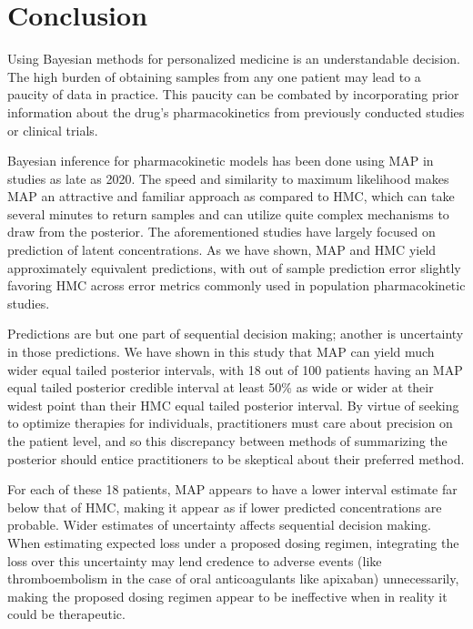 \section{Conclusion}

Using Bayesian methods for personalized medicine is an understandable decision.  The high burden of obtaining samples from any one patient may lead to a paucity of data in practice.  This paucity can be combated by incorporating prior information about the drug’s pharmacokinetics from previously conducted studies or clinical trials.

Bayesian inference for pharmacokinetic models has been done using MAP in studies as late as 2020.  The speed and similarity to maximum likelihood makes MAP an attractive and familiar approach as compared to HMC, which can take several minutes to return samples and can utilize quite complex mechanisms to draw from the posterior. The aforementioned studies have largely focused on prediction of latent concentrations.  As we have shown, MAP and HMC yield approximately equivalent predictions, with out of sample prediction error slightly favoring HMC across error metrics commonly used in population pharmacokinetic studies. 

Predictions are but one part of sequential decision making; another is uncertainty in those predictions.  We have shown in this study that MAP can yield much wider equal tailed posterior intervals, with 18 out of 100 patients having an MAP equal tailed posterior credible interval at least 50\% as wide or wider at their widest point than their HMC equal tailed posterior interval.  By virtue of seeking to optimize therapies for individuals, practitioners must care about precision on the patient level, and so this discrepancy between  methods of summarizing the posterior should entice practitioners to be skeptical about their preferred method.

For each of these 18 patients, MAP appears to have a lower interval estimate far below that of HMC, making it appear as if lower predicted concentrations are probable. Wider estimates of uncertainty affects sequential decision making.  When estimating expected loss under a proposed dosing regimen, integrating the loss over this uncertainty may lend credence to adverse events (like thromboembolism in the case of oral anticoagulants like apixaban) unnecessarily, making the proposed dosing regimen appear to be ineffective when in reality it could be therapeutic. 

